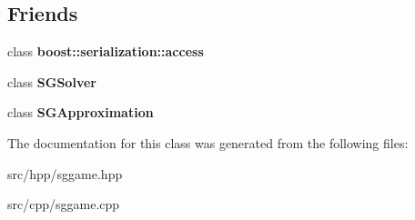 \subsection*{Friends}
\begin{DoxyCompactItemize}
\item 
\hypertarget{class_s_g_game_ac98d07dd8f7b70e16ccb9a01abf56b9c}{class {\bfseries boost\+::serialization\+::access}}\label{class_s_g_game_ac98d07dd8f7b70e16ccb9a01abf56b9c}

\item 
\hypertarget{class_s_g_game_a8b0e5d2bebfed7e7e032366bb49bc5f1}{class {\bfseries S\+G\+Solver}}\label{class_s_g_game_a8b0e5d2bebfed7e7e032366bb49bc5f1}

\item 
\hypertarget{class_s_g_game_adaa41c100279e40c34d42b18d0c2ed21}{class {\bfseries S\+G\+Approximation}}\label{class_s_g_game_adaa41c100279e40c34d42b18d0c2ed21}

\end{DoxyCompactItemize}


The documentation for this class was generated from the following files\+:\begin{DoxyCompactItemize}
\item 
src/hpp/sggame.\+hpp\item 
src/cpp/sggame.\+cpp\end{DoxyCompactItemize}
